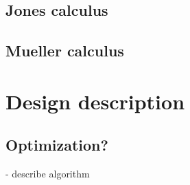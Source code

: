 \subsection{Jones calculus}

\subsection{Mueller calculus}
\label{sec:muellercalc}

\section{Design description}
\label{sec:design}

\subsection{Optimization?}
- describe algorithm
